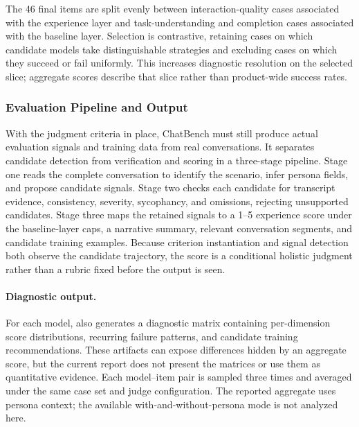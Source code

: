 The 46 final items are split evenly between interaction-quality cases associated with the experience layer and task-understanding and completion cases associated with the baseline layer. Selection is contrastive, retaining cases on which candidate models take distinguishable strategies and excluding cases on which they succeed or fail uniformly. This increases diagnostic resolution on the selected slice; aggregate scores describe that slice rather than product-wide success rates.

\subsubsection{Evaluation Pipeline and Output}
\label{sec:chatbench_pipeline}

With the judgment criteria in place, ChatBench must still produce actual evaluation signals and training data from real conversations. It separates candidate detection from verification and scoring in a three-stage pipeline. Stage one reads the complete conversation to identify the scenario, infer persona fields, and propose candidate signals. Stage two checks each candidate for transcript evidence, consistency, severity, sycophancy, and omissions, rejecting unsupported candidates. Stage three maps the retained signals to a 1--5 experience score under the baseline-layer caps, a narrative summary, relevant conversation segments, and candidate training examples. Because criterion instantiation and signal detection both observe the candidate trajectory, the score is a conditional holistic judgment rather than a rubric fixed before the output is seen.

\paragraph{Diagnostic output.}
\label{sec:chatbench_output}
For each model, \chatbench{} also generates a diagnostic matrix containing per-dimension score distributions, recurring failure patterns, and candidate training recommendations. These artifacts can expose differences hidden by an aggregate score, but the current report does not present the matrices or use them as quantitative evidence. Each model--item pair is sampled three times and averaged under the same case set and judge configuration. The reported aggregate uses persona context; the available with-and-without-persona mode is not analyzed here.


\subsection{\livingbench}
\label{sec:livingbench}

